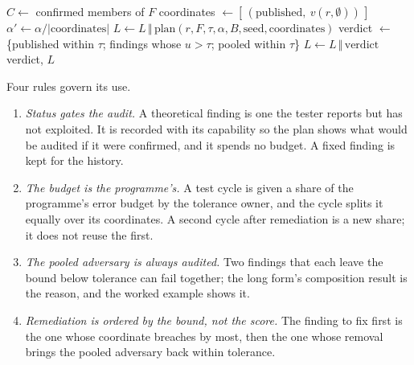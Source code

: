 \documentclass[11pt,a4paper]{article}
\begin{document}
\begin{algorithm}[htbp]
\caption{Penetration-test findings as audited adversaries}
\label{alg:pentest}
$C\gets$ confirmed members of $F$ 
coordinates $\gets[\,(\text{published},\ v(r,\emptyset))\,]$\;
$\alpha'\gets\alpha/|\text{coordinates}|$\;
$L\gets L\,\Vert\,\text{plan}(r,F,\tau,\alpha,B,\text{seed},\text{coordinates})$ 
verdict $\gets$ \{published within $\tau$; findings whose $u>\tau$; pooled within $\tau$\}\;
$L\gets L\,\Vert\,\text{verdict}$\;
\Return verdict, $L$
\end{algorithm}

Four rules govern its use.
\begin{enumerate}
\item \emph{Status gates the audit.} A theoretical finding is one the tester reports but has not exploited. It is recorded with its capability so the plan shows what would be audited if it were confirmed, and it spends no budget. A fixed finding is kept for the history.
\item \emph{The budget is the programme's.} A test cycle is given a share of the programme's error budget by the tolerance owner, and the cycle splits it equally over its coordinates. A second cycle after remediation is a new share; it does not reuse the first.
\item \emph{The pooled adversary is always audited.} Two findings that each leave the bound below tolerance can fail together; the long form's composition result is the reason, and the worked example shows it.
\item \emph{Remediation is ordered by the bound, not the score.} The finding to fix first is the one whose coordinate breaches by most, then the one whose removal brings the pooled adversary back within tolerance.
\end{enumerate}
\end{document}
